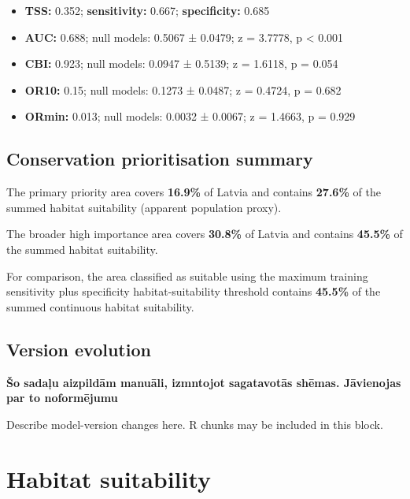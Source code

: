 \documentclass[
  openany]{book}
\providecommand{\tightlist}{%
  \setlength{\itemsep}{0pt}\setlength{\parskip}{0pt}}
\providecommand{\tightlist}{%
  \setlength{\itemsep}{0pt}%
  \setlength{\parskip}{0pt}%
}
\begin{document}
\begin{itemize}
\tightlist
\item
  \textbf{TSS:} 0.352; \textbf{sensitivity:} 0.667; \textbf{specificity:} 0.685
\item
  \textbf{AUC:} 0.688; null models: 0.5067 ± 0.0479; z = 3.7778, p \textless{} 0.001
\item
  \textbf{CBI:} 0.923; null models: 0.0947 ± 0.5139; z = 1.6118, p = 0.054
\item
  \textbf{OR10:} 0.15; null models: 0.1273 ± 0.0487; z = 0.4724, p = 0.682
\item
  \textbf{ORmin:} 0.013; null models: 0.0032 ± 0.0067; z = 1.4663, p = 0.929
\end{itemize}

\subsection*{Conservation prioritisation summary}\label{conservation-prioritisation-summary-24}

The primary priority area covers \textbf{16.9\%} of Latvia and contains \textbf{27.6\%} of the summed habitat suitability (apparent population proxy).

The broader high importance area covers \textbf{30.8\%} of Latvia and contains \textbf{45.5\%} of the summed habitat suitability.

For comparison, the area classified as suitable using the maximum training sensitivity plus specificity habitat-suitability threshold contains \textbf{45.5\%} of the summed continuous habitat suitability.

\subsection*{Version evolution}\label{version-evolution-24}

\textbf{Šo sadaļu aizpildām manuāli, izmntojot sagatavotās shēmas. Jāvienojas par to noformējumu}

Describe model-version changes here. R chunks may be included in this block.

\section*{Habitat suitability}\label{habitat-suitability-24}
\end{document}
